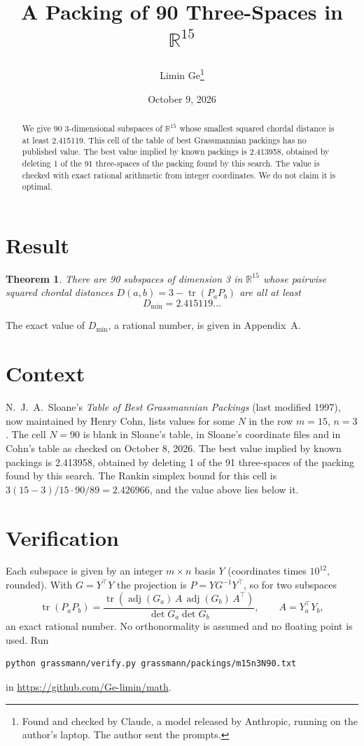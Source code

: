 \documentclass[11pt,a4paper]{article}
\title{A Packing of 90 Three-Spaces in $\mathbb{R}^{15}$}
\author{Limin Ge\thanks{Found and checked by Claude, a model released by Anthropic, running on the author's laptop. The author sent the prompts.}}
\date{October 9, 2026}
\newtheorem*{theorem}{Theorem}
\begin{document}
\maketitle
\begin{abstract}
We give 90 3-dimensional subspaces of $\mathbb{R}^{15}$ whose smallest squared chordal distance is at least 2.415119. This cell of the table of best Grassmannian packings has no published value. The best value implied by known packings is 2.413958, obtained by deleting 1 of the 91 three-spaces of the packing found by this search. The value is checked with exact rational arithmetic from integer coordinates. We do not claim it is optimal.
\end{abstract}

\section{Result}
\begin{theorem}
There are 90 subspaces of dimension 3 in $\mathbb{R}^{15}$ whose pairwise squared chordal distances $D(a,b) = 3 - \operatorname{tr}(P_aP_b)$ are all at least
\[ D_{\min} = 2.415119\ldots \]
\end{theorem}
The exact value of $D_{\min}$, a rational number, is given in Appendix~A.


\section{Context}
N.~J.~A.~Sloane's \emph{Table of Best Grassmannian Packings} (last modified 1997), now maintained by Henry Cohn, lists values for some $N$ in the row $m=15$, $n=3$. The cell $N=90$ is blank in Sloane's table, in Sloane's coordinate files and in Cohn's table as checked on October 8, 2026. The best value implied by known packings is 2.413958, obtained by deleting 1 of the 91 three-spaces of the packing found by this search. The Rankin simplex bound for this cell is $3(15-3)/15\cdot 90/89 = 2.426966$, and the value above lies below it.


\section{Verification}
Each subspace is given by an integer $m\times n$ basis $Y$ (coordinates times $10^{12}$, rounded). With $G=Y^\top Y$ the projection is $P=YG^{-1}Y^\top$, so for two subspaces
\[ \operatorname{tr}(P_aP_b)=\frac{\operatorname{tr}(\operatorname{adj}(G_a)\,A\,\operatorname{adj}(G_b)\,A^\top)}{\det G_a\det G_b},\qquad A=Y_a^\top Y_b, \]
an exact rational number. No orthonormality is assumed and no floating point is used. Run
\begin{verbatim}
python grassmann/verify.py grassmann/packings/m15n3N90.txt
\end{verbatim}
in \url{https://github.com/Ge-limin/math}.
\end{document}

